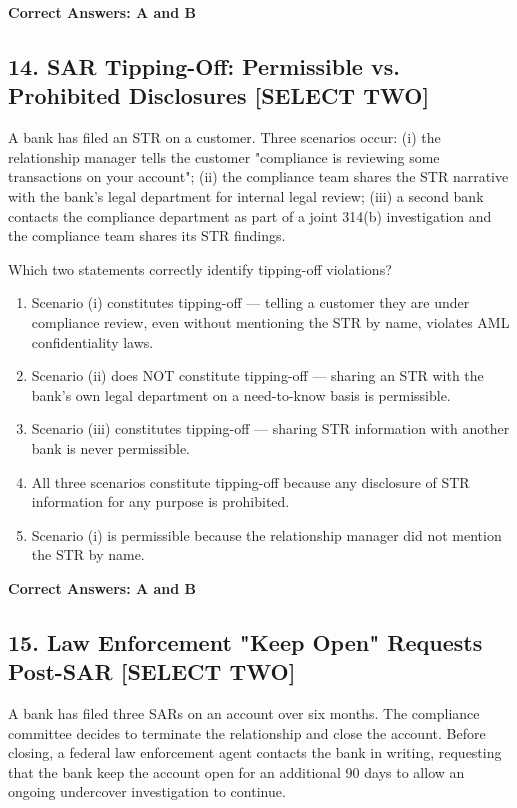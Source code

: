 \documentclass[11pt,a4paper]{article}
\begin{document}
	\textbf{Correct Answers: A and B}
	
	\subsection{14. SAR Tipping-Off: Permissible vs. Prohibited Disclosures \textnormal{[SELECT TWO]}}
	
	A bank has filed an STR on a customer. Three scenarios occur: (i) the relationship manager tells the customer "compliance is reviewing some transactions on your account"; (ii) the compliance team shares the STR narrative with the bank's legal department for internal legal review; (iii) a second bank contacts the compliance department as part of a joint 314(b) investigation and the compliance team shares its STR findings.
	
	Which two statements correctly identify tipping-off violations?
	
	\begin{enumerate}[label=\Alph*.]
		\item Scenario (i) constitutes tipping-off — telling a customer they are under compliance review, even without mentioning the STR by name, violates AML confidentiality laws.
		\item Scenario (ii) does NOT constitute tipping-off — sharing an STR with the bank's own legal department on a need-to-know basis is permissible.
		\item Scenario (iii) constitutes tipping-off — sharing STR information with another bank is never permissible.
		\item All three scenarios constitute tipping-off because any disclosure of STR information for any purpose is prohibited.
		\item Scenario (i) is permissible because the relationship manager did not mention the STR by name.
	\end{enumerate}
	
	\textbf{Correct Answers: A and B}
	
	\subsection{15. Law Enforcement "Keep Open" Requests Post-SAR \textnormal{[SELECT TWO]}}
	
	A bank has filed three SARs on an account over six months. The compliance committee decides to terminate the relationship and close the account. Before closing, a federal law enforcement agent contacts the bank in writing, requesting that the bank keep the account open for an additional 90 days to allow an ongoing undercover investigation to continue.
	
\end{document}

